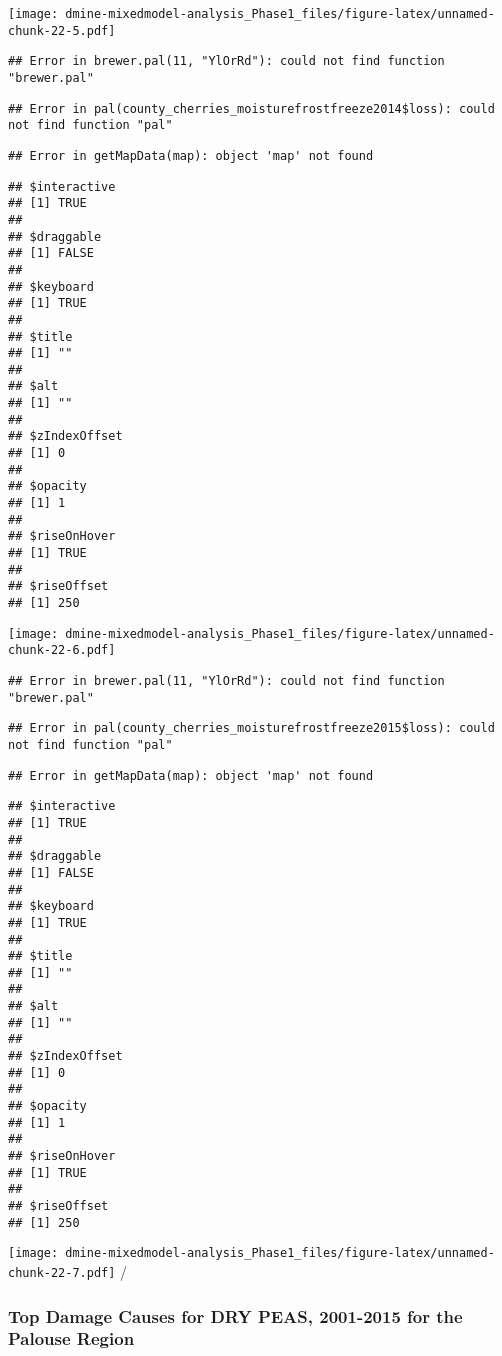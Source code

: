 \documentclass[]{article}
\begin{document}
\texttt{[image: dmine-mixedmodel-analysis\_Phase1\_files/figure-latex/unnamed-chunk-22-5.pdf]}

\begin{verbatim}
## Error in brewer.pal(11, "YlOrRd"): could not find function "brewer.pal"
\end{verbatim}

\begin{verbatim}
## Error in pal(county_cherries_moisturefrostfreeze2014$loss): could not find function "pal"
\end{verbatim}

\begin{verbatim}
## Error in getMapData(map): object 'map' not found
\end{verbatim}

\begin{verbatim}
## $interactive
## [1] TRUE
## 
## $draggable
## [1] FALSE
## 
## $keyboard
## [1] TRUE
## 
## $title
## [1] ""
## 
## $alt
## [1] ""
## 
## $zIndexOffset
## [1] 0
## 
## $opacity
## [1] 1
## 
## $riseOnHover
## [1] TRUE
## 
## $riseOffset
## [1] 250
\end{verbatim}

\texttt{[image: dmine-mixedmodel-analysis\_Phase1\_files/figure-latex/unnamed-chunk-22-6.pdf]}

\begin{verbatim}
## Error in brewer.pal(11, "YlOrRd"): could not find function "brewer.pal"
\end{verbatim}

\begin{verbatim}
## Error in pal(county_cherries_moisturefrostfreeze2015$loss): could not find function "pal"
\end{verbatim}

\begin{verbatim}
## Error in getMapData(map): object 'map' not found
\end{verbatim}

\begin{verbatim}
## $interactive
## [1] TRUE
## 
## $draggable
## [1] FALSE
## 
## $keyboard
## [1] TRUE
## 
## $title
## [1] ""
## 
## $alt
## [1] ""
## 
## $zIndexOffset
## [1] 0
## 
## $opacity
## [1] 1
## 
## $riseOnHover
## [1] TRUE
## 
## $riseOffset
## [1] 250
\end{verbatim}

\texttt{[image: dmine-mixedmodel-analysis\_Phase1\_files/figure-latex/unnamed-chunk-22-7.pdf]}
/

\subsubsection{Top Damage Causes for DRY PEAS, 2001-2015 for the Palouse
Region}\label{top-damage-causes-for-dry-peas-2001-2015-for-the-palouse-region}
\end{document}
